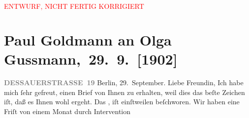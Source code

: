 
\begin{center}
            \textcolor{red}{ENTWURF, NICHT FERTIG KORRIGIERT}
                      \end{center}
            
         
         \renewcommand{\erwaehntePersonen}{Personen: Paul Goldmann, Rudolf Gussmann, Olga Schnitzler, Heinrich Schnitzler, Elisabeth Steinrück}
         \renewcommand{\erwaehnteInstitutionen}{Institutionen: Preußische Polzei, Schiller-Theater}
         \renewcommand{\erwaehnteOrte}{Orte: Berlin, Dessauer Straße, Gentzgasse, Hinterbrühl, Preußen, Wien}
         \renewcommand{\erwaehnteWerke}{}
               \section[ Paul Goldmann an Olga Gussmann, 29. 9. {[}1902{]}]{ Paul Goldmann an Olga Gussmann, 29. 9. {[}1902{]}}\nopagebreak{}\rehead{ }\begin{ledgroupsized}[t]{13cm}\normalsize\beginnumbering \toendnotes[C]{\smallbreak\pagebreak[2]} 
\toendnotes[C]{\smallbreak}\pstart
           \noindent{}\raggedleft{}{\pb}\textcolor{gray}{\textbf{DESSAUERSTRASSE 19}}\pend
           \pstart
           Berlin, 29. September.\pend
           \pstart\center{}Liebe Freundin,\pend\pstart
           Ich habe mich ſehr gefreut, einen Brief von Ihnen zu erhalten, weil dies das beſte
               Zeichen iſt, daß es Ihnen wohl ergeht.\pend
           \pstart
           Das \label{K_L03534-1v}\label{K_L03534-1h},
               iſt einſtweilen beſchworen. Wir haben eine Friſt von einem Monat durch Intervention

\end{ledgroupsized}
